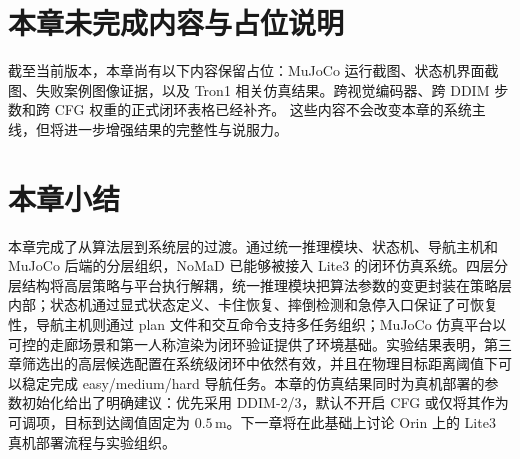 \section{本章未完成内容与占位说明}

截至当前版本，本章尚有以下内容保留占位：MuJoCo 运行截图、状态机界面截图、失败案例图像证据，以及 Tron1 相关仿真结果。跨视觉编码器、跨 DDIM 步数和跨 CFG 权重的正式闭环表格已经补齐。
这些内容不会改变本章的系统主线，但将进一步增强结果的完整性与说服力。

\section{本章小结}

本章完成了从算法层到系统层的过渡。通过统一推理模块、状态机、导航主机和 MuJoCo 后端的分层组织，NoMaD 已能够被接入 Lite3 的闭环仿真系统。四层分层结构将高层策略与平台执行解耦，统一推理模块把算法参数的变更封装在策略层内部；状态机通过显式状态定义、卡住恢复、摔倒检测和急停入口保证了可恢复性，导航主机则通过 plan 文件和交互命令支持多任务组织；MuJoCo 仿真平台以可控的走廊场景和第一人称渲染为闭环验证提供了环境基础。实验结果表明，第三章筛选出的高层候选配置在系统级闭环中依然有效，并且在物理目标距离阈值下可以稳定完成 easy/medium/hard 导航任务。本章的仿真结果同时为真机部署的参数初始化给出了明确建议：优先采用 DDIM-2/3，默认不开启 CFG 或仅将其作为可调项，目标到达阈值固定为 $0.5\,\mathrm{m}$。下一章将在此基础上讨论 Orin 上的 Lite3 真机部署流程与实验组织。
